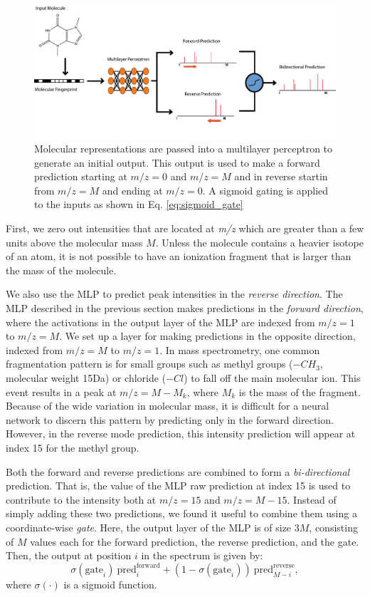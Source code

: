 \begin{figure}[h]
    \centering
    \includegraphics[width=0.8\linewidth]{Model_prediction.png}
    \caption[Neural Electron Ionization MS Prediction Model]{Molecular representations are passed into a multilayer perceptron to generate an initial output. This output is used to make a forward prediction starting at $\textit{m/z}=0$ and $\textit{m/z}=M$ and in reverse startin from $\textit{m/z}=M$ and ending at $\textit{m/z}=0$. A sigmoid gating is applied to the inputs as shown in Eq. \ref{eq:sigmoid_gate}}
    \label{fig:model_prediction}
\end{figure}

First, we zero out intensities that are located at \textit{m/z} which are greater than a few units above the molecular mass $M$. Unless the molecule contains a heavier isotope of an atom, it is not possible to have an ionization fragment that is larger than the mass of the molecule.

We also use the MLP to predict peak intensities in the \textit{reverse direction}.  The MLP described in the previous section makes predictions in the \textit{forward direction}, where the activations in the output layer of the MLP are indexed from $m/z = 1$ to $m/z = M$. We set up a layer for making predictions in the opposite direction, indexed from $m/z = M$ to $m/z = 1$. In mass spectrometry, one common fragmentation pattern is for small groups such as methyl groups ($-CH_3$, molecular weight 15Da) or chloride ($-Cl$) to fall off the main molecular ion. This event results in a peak at $m/z = M - M_k$, where $M_k$ is the mass of the fragment. Because of the wide variation in molecular mass, it is difficult for a neural network to discern this pattern by predicting only in the forward direction. However, in the reverse mode prediction, this intensity prediction will appear at index 15 for the methyl group.

Both the forward and reverse predictions are  combined to form a \textit{bi-directional} prediction. That is, the value of the MLP raw prediction at index 15 is used to contribute to the intensity both at $m/z = 15$ and $m/z = M - 15$. Instead of simply adding these two predictions, we found it useful to combine them using a coordinate-wise \textit{gate}. Here, the output layer of the MLP is of size $3M$, consisting of $M$ values each for the forward prediction, the reverse prediction, and the gate. Then, the output at position $i$ in the spectrum is given by:
\begin{equation}\label{eq:sigmoid_gate}
\sigma(\text{gate}_i) ~ \text{pred}^\text{forward}_i + (1 - \sigma(\text{gate}_i)) ~ \text{pred}^\text{reverse}_{M - i},
\end{equation}
where $\sigma(\cdot)$ is a sigmoid function.

